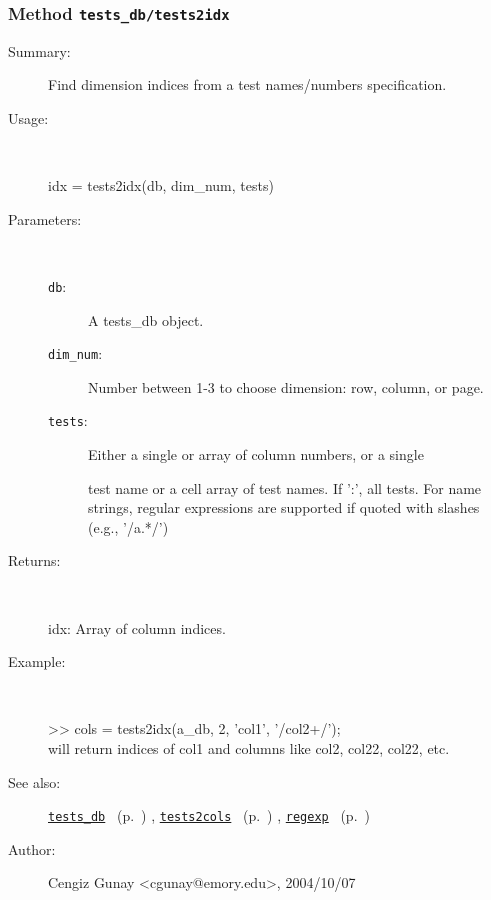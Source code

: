 \subsubsection[Method \texttt{tests2idx}]{Method \texttt{tests\_db/tests2idx}}%
%
\label{ref_tests_db__tests2idx}%
\hypertarget{ref_tests_db__tests2idx}{}%
\begin{description}
\item[Summary:]Find dimension indices from a test names/numbers specification.
%
\item[Usage:]~%
\begin{lyxcode}%
idx = tests2idx(db, dim\_num, tests)
%
\end{lyxcode}%
%
%
\item[Parameters:]~
\begin{description}%
\item[\texttt{db}:]
 A tests\_db object.
\item[\texttt{dim\_num}:]
 Number between 1-3 to choose dimension: row, column, or page.
\item[\texttt{tests}:]
 Either a single or array of column numbers, or a single

test name or a cell array of test names. If ':', all
tests. For name strings, regular expressions are
supported if quoted with slashes (e.g., '/a.*/')
\end{description}%
%
\item[Returns:
]~

	idx: Array of column indices.
%
\item[Example:]~
\begin{lyxcode} >> cols = tests2idx(a\_db, 2, {'col1', '/col2+/'});
\\%
 will return indices of col1 and columns like col2, col22, col22, etc.
\\%
\end{lyxcode}
%
\item[See also:]%
\hyperlink{ref_tests_db}{\texttt{tests\_db}}%
\ (p.~\pageref{ref_tests_db})%
%
, \hyperlink{ref_tests2cols}{\texttt{tests2cols}}%
\ (p.~\pageref{ref_tests2cols})%
%
, \hyperlink{ref_regexp}{\texttt{regexp}}%
\ (p.~\pageref{ref_regexp})%
%
%
\item[Author:]%
Cengiz Gunay <cgunay@emory.edu>, 2004/10/07
%
\end{description}
\methodline%
